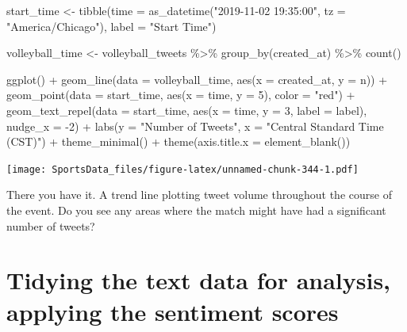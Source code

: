 \documentclass[
]{book}
\newenvironment{Shaded}{\begin{snugshade}}{\end{snugshade}}
\newcommand{\AttributeTok}[1]{\textcolor[rgb]{0.77,0.63,0.00}{#1}}
\newcommand{\DecValTok}[1]{\textcolor[rgb]{0.00,0.00,0.81}{#1}}
\newcommand{\FunctionTok}[1]{\textcolor[rgb]{0.00,0.00,0.00}{#1}}
\newcommand{\NormalTok}[1]{#1}
\newcommand{\OtherTok}[1]{\textcolor[rgb]{0.56,0.35,0.01}{#1}}
\newcommand{\SpecialCharTok}[1]{\textcolor[rgb]{0.00,0.00,0.00}{#1}}
\newcommand{\StringTok}[1]{\textcolor[rgb]{0.31,0.60,0.02}{#1}}
\begin{document}
\begin{Shaded}
\begin{Highlighting}[]
\NormalTok{start\_time }\OtherTok{\textless{}{-}} \FunctionTok{tibble}\NormalTok{(}\AttributeTok{time =} \FunctionTok{as\_datetime}\NormalTok{(}\StringTok{"2019{-}11{-}02 19:35:00"}\NormalTok{, }\AttributeTok{tz =} \StringTok{"America/Chicago"}\NormalTok{), }\AttributeTok{label =} \StringTok{"Start Time"}\NormalTok{) }

\NormalTok{volleyball\_time }\OtherTok{\textless{}{-}}\NormalTok{ volleyball\_tweets }\SpecialCharTok{\%\textgreater{}\%}
  \FunctionTok{group\_by}\NormalTok{(created\_at) }\SpecialCharTok{\%\textgreater{}\%} 
  \FunctionTok{count}\NormalTok{()}

\FunctionTok{ggplot}\NormalTok{() }\SpecialCharTok{+}
  \FunctionTok{geom\_line}\NormalTok{(}\AttributeTok{data =}\NormalTok{ volleyball\_time, }\FunctionTok{aes}\NormalTok{(}\AttributeTok{x =}\NormalTok{ created\_at, }\AttributeTok{y =}\NormalTok{ n)) }\SpecialCharTok{+}
  \FunctionTok{geom\_point}\NormalTok{(}\AttributeTok{data =}\NormalTok{ start\_time, }\FunctionTok{aes}\NormalTok{(}\AttributeTok{x =}\NormalTok{ time, }\AttributeTok{y =} \DecValTok{5}\NormalTok{), }\AttributeTok{color =} \StringTok{"red"}\NormalTok{) }\SpecialCharTok{+}
  \FunctionTok{geom\_text\_repel}\NormalTok{(}\AttributeTok{data =}\NormalTok{ start\_time, }\FunctionTok{aes}\NormalTok{(}\AttributeTok{x =}\NormalTok{ time, }\AttributeTok{y =} \DecValTok{3}\NormalTok{, }\AttributeTok{label =}\NormalTok{ label), }\AttributeTok{nudge\_x =} \SpecialCharTok{{-}}\DecValTok{2}\NormalTok{) }\SpecialCharTok{+}
  \FunctionTok{labs}\NormalTok{(}\AttributeTok{y =} \StringTok{"Number of Tweets"}\NormalTok{,}
       \AttributeTok{x =} \StringTok{"Central Standard Time (CST)"}\NormalTok{) }\SpecialCharTok{+}
  \FunctionTok{theme\_minimal}\NormalTok{() }\SpecialCharTok{+}
  \FunctionTok{theme}\NormalTok{(}\AttributeTok{axis.title.x =} \FunctionTok{element\_blank}\NormalTok{())}
\end{Highlighting}
\end{Shaded}

\texttt{[image: SportsData\_files/figure-latex/unnamed-chunk-344-1.pdf]}

There you have it. A trend line plotting tweet volume throughout the course of the event. Do you see any areas where the match might have had a significant number of tweets?

\hypertarget{tidying-the-text-data-for-analysis-applying-the-sentiment-scores}{%
\section{Tidying the text data for analysis, applying the sentiment scores}\label{tidying-the-text-data-for-analysis-applying-the-sentiment-scores}}
\end{document}
